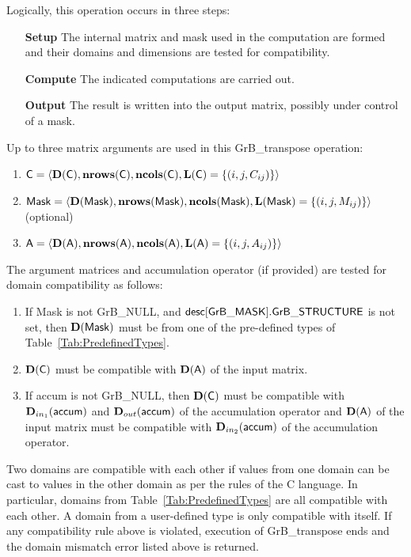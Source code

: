 Logically, this operation occurs in three steps:
\begin{enumerate}[leftmargin=0.75in]
\item[\bf Setup] The internal matrix and mask used in the computation are formed 
and their domains and dimensions are tested for compatibility.
\item[\bf Compute] The indicated computations are carried out.
\item[\bf Output] The result is written into the output matrix, possibly under 
control of a mask.
\end{enumerate}

Up to three matrix arguments are used in this {\sf GrB\_transpose} operation:
\begin{enumerate}
	\item ${\sf C} = \langle \bold{D}({\sf C}),\bold{nrows}({\sf C}),
    \bold{ncols}({\sf C}),\bold{L}({\sf C}) = \{(i,j,C_{ij}) \} \rangle$

	\item ${\sf Mask} = \langle \bold{D}({\sf Mask}),\bold{nrows}({\sf Mask}),
    \bold{ncols}({\sf Mask}),\bold{L}({\sf Mask}) = \{(i,j,M_{ij}) \} \rangle$ (optional)

	\item ${\sf A} = \langle \bold{D}({\sf A}),\bold{nrows}({\sf A}),
    \bold{ncols}({\sf A}),\bold{L}({\sf A}) = \{(i,j,A_{ij}) \} \rangle$
\end{enumerate}

The argument matrices and accumulation 
operator (if provided) are tested for domain compatibility as follows:
\begin{enumerate}
	\item If {\sf Mask} is not {\sf GrB\_NULL}, and ${\sf desc[GrB\_MASK].GrB\_STRUCTURE}$
    is not set, then $\bold{D}({\sf Mask})$ must be from one of the pre-defined types of 
    Table~\ref{Tab:PredefinedTypes}.

	\item $\bold{D}({\sf C})$ must be
    compatible with $\bold{D}({\sf A})$ of the input matrix.

	\item If {\sf accum} is not {\sf GrB\_NULL}, then $\bold{D}({\sf C})$ must be
    compatible with $\mbox{$\mathbf{D}_{in_{1}}$}({\sf accum})$ and $\mbox{$\mathbf{D}_{out}$}({\sf accum})$ of the accumulation operator and 
    $\bold{D}({\sf A})$ of the input matrix must be compatible with $\mbox{$\mathbf{D}_{in_{2}}$}({\sf accum})$ of the accumulation operator.

\end{enumerate}
Two domains are compatible with each other if values from one domain can be cast 
to values in the other domain as per the rules of the C language.
In particular, domains from Table~\ref{Tab:PredefinedTypes} are all compatible 
with each other. A domain from a user-defined type is only compatible with itself.
If any compatibility rule above is violated, execution of {\sf GrB\_transpose} ends and 
the domain mismatch error listed above is returned.

